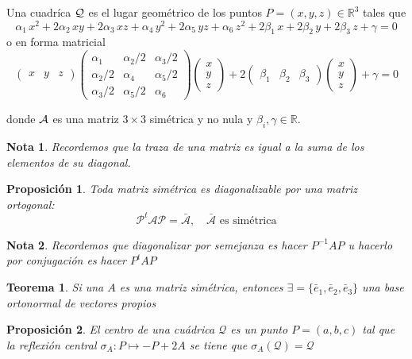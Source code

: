 \documentclass[11pt, a4paper, titlepage]{article}
\theoremstyle{theorem-style}
\newtheorem{nth}{Teorema}[section]
\newtheorem{nprop}{Proposición}[section]
\theoremstyle{definition-style}
\theoremstyle{remark-style}
\newtheorem*{nota}{Nota}
\theoremstyle{example-style}
\begin{document}
Una cuadr\'ica  $\cal Q$ es el lugar geom\'etrico de los puntos $P=(x,y,z)\in\mathbb{R}^3$ tales que
\[ 
\alpha_1 \,x^2 + 2\alpha_2 \,x y + 2\alpha_3\,x z + \alpha_4 \,y^2 + 2 \alpha_5 \,y z + \alpha_6 \,z^2 
+ 2\beta_1 \,x+ 2\beta_2 \,y +2 \beta_3 \,z + \gamma = 0
\]
o en forma matricial 
\[  
\left( \begin{array}{ccc} 
x & y & z   
 \end{array} \right)\begin{pmatrix}
 \alpha_1 & \alpha_2 / 2 &\alpha_3 / 2\\
 \alpha_2 / 2 & \alpha_4 &\alpha_5 / 2\\
 \alpha_3 / 2& \alpha_5 / 2& \alpha_6
\end{pmatrix} 
\left(\begin{array}{c}
x \\
y \\
z
\end{array} \right)
+
 2\left( \begin{array}{ccc}
\beta_1 & \beta_2 & \beta_3   
 \end{array} \right)
\left( \begin{array}{c}
x \\
y \\
z
 \end{array} \right)
+ \gamma = 0
\]

donde $\cal A$ es una matriz $3\times 3$ sim\'etrica y no nula y $\beta_i, \gamma\in\mathbb{R}$. 

\begin{nota}
	Recordemos que la traza de una matriz es igual a la suma de los elementos de su diagonal.
\end{nota}

\begin{nprop}
	Toda matriz simétrica es diagonalizable por una matriz ortogonal:
	\[
	\mathcal P ^t \mathcal A \mathcal P = \bar{ \mathcal A}, \quad \text{$\bar{\mathcal A}$ es simétrica}
	\]
\end{nprop}
\begin{nota}
	Recordemos que diagonalizar por semejanza es hacer $P^{-1}AP$ u hacerlo por conjugación es hacer $P^t A P$
\end{nota}

\begin{nth}
	Si una $A$ es una matriz simétrica, entonces $\exists = \{\bar e_1, \bar e_2, \bar e_3\}$ una base ortonormal de vectores propios
\end{nth}

\begin{nprop}
	El centro de una cuádrica $\mathcal Q$ es un punto $P=(a,b,c)$ tal que la reflexión central $\sigma_A: P \mapsto -P+2A$ se tiene que $\sigma_A (\mathcal Q) = \mathcal Q$
\end{nprop}
\end{document}
